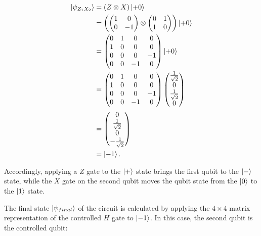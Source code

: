 \begin{align}
  \Ket{\psi_{Z_1X_2}}  &= (Z \otimes X) \Ket{+0} \\
                    &= \left(\begin{pmatrix} 1 & 0 \\ 0 & -1 \end{pmatrix} \otimes \begin{pmatrix} 0 & 1 \\ 1 & 0 \end{pmatrix}\right) \Ket{+0} \\
                    &= \begin{pmatrix} 0 & 1 & 0 & 0 \\ 1 & 0 & 0 & 0 \\ 0 & 0 & 0 & -1 \\ 0 & 0 & -1 & 0 \end{pmatrix} \Ket{+0} \\
                    &= \begin{pmatrix} 0 & 1 & 0 & 0 \\ 1 & 0 & 0 & 0 \\ 0 & 0 & 0 & -1 \\ 0 & 0 & -1 & 0 \end{pmatrix} \begin{pmatrix} \frac{1}{\sqrt{2}} \\ 0 \\ \frac{1}{\sqrt{2}} \\ 0 \end{pmatrix} \\
                    &= \begin{pmatrix} 0 \\ \frac{1}{\sqrt{2}} \\ 0 \\ -\frac{1}{\sqrt{2}} \end{pmatrix} \\
                    &= \Ket{-1}.
\end{align}

Accordingly, applying a $Z$ gate to the $\Ket{+}$
state brings the first qubit to the $\Ket{-}$ state, while the $X$ gate on the second qubit moves the qubit state from the $\Ket{0}$ to the $\Ket{1}$ state.

The final state $\Ket{\psi_{final}}$ of the circuit is calculated by applying the $4 \times 4$ matrix
representation of the controlled $H$ gate to $\Ket{-1}$. In this case, the second
qubit is the controlled qubit:

